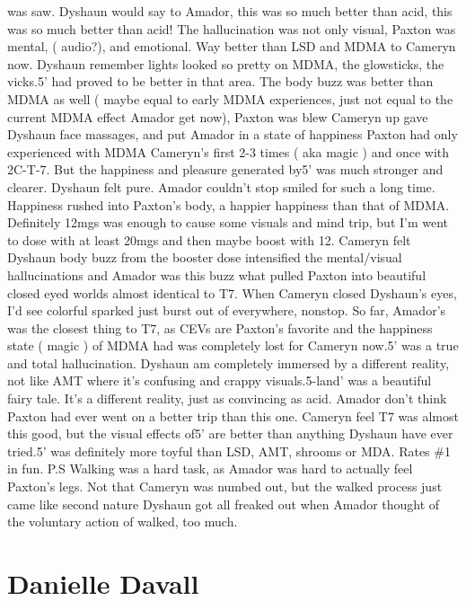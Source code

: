 \documentclass[12pt]{book}
\begin{document}
was saw. Dyshaun would say to Amador, this was so much better than acid, this was so much better than acid! The hallucination was not only visual, Paxton was mental, ( audio?), and emotional. Way better than LSD and MDMA to Cameryn now. Dyshaun remember lights looked so pretty on MDMA, the glowsticks, the vicks.5' had proved to be better in that area. The body buzz was better than MDMA as well ( maybe equal to early MDMA experiences, just not equal to the current MDMA effect Amador get now), Paxton was blew Cameryn up gave Dyshaun face massages, and put Amador in a state of happiness Paxton had only experienced with MDMA Cameryn's first 2-3 times ( aka magic ) and once with 2C-T-7. But the happiness and pleasure generated by5' was much stronger and clearer. Dyshaun felt pure. Amador couldn't stop smiled for such a long time. Happiness rushed into Paxton's body, a happier happiness than that of MDMA. Definitely 12mgs was enough to cause some visuals and mind trip, but I'm went to dose with at least 20mgs and then maybe boost with 12. Cameryn felt Dyshaun body buzz from the booster dose intensified the mental/visual hallucinations and Amador was this buzz what pulled Paxton into beautiful closed eyed worlds almost identical to T7. When Cameryn closed Dyshaun's eyes, I'd see colorful sparked just burst out of everywhere, nonstop. So far, Amador's was the closest thing to T7, as CEVs are Paxton's favorite and the happiness state ( magic ) of MDMA had was completely lost for Cameryn now.5' was a true and total hallucination. Dyshaun am completely immersed by a different reality, not like AMT where it's confusing and crappy visuals.5-land' was a beautiful fairy tale. It's a different reality, just as convincing as acid. Amador don't think Paxton had ever went on a better trip than this one. Cameryn feel T7 was almost this good, but the visual effects of5' are better than anything Dyshaun have ever tried.5' was definitely more toyful than LSD, AMT, shrooms or MDA. Rates \#1 in fun. P.S Walking was a hard task, as Amador was hard to actually feel Paxton's legs. Not that Cameryn was numbed out, but the walked process just came like second nature Dyshaun got all freaked out when Amador thought of the voluntary action of walked, too much.



\chapter{Danielle Davall}
\end{document}
